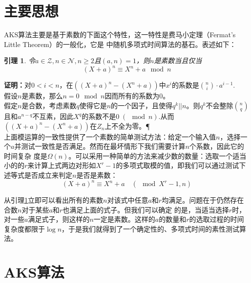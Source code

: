\documentclass[a4paper]{article}
\newtheorem{lemma}{引理}[section]
\numberwithin{equation}{section}
\begin{document}
\begin{multicols}{2}
  \section{主要思想}
  AKS算法主要是基于素数的下面这个特性，这一特性是费马小定理（Fermat’s Little
  Theorem）的一般化，它是\cite{AB03} 中随机多项式时间算法的基石。表述如下：
  \begin{lemma}\label{idea}
    \upshape 令$a\in \mathcal{Z},n\in \mathcal{N},n\ge
    2$且$(a,n)=1$，则$n$是素数当且仅当
    \begin{equation}
      (X+a)^{n}\equiv X^n+a\mod{n}
    \end{equation}
  \end{lemma}
  \noindent \textbf{证明：}对$0<i<n$，在$((X+a)^n - (X^n +
  a))$中$x^i$的系数是$\binom{n}{i}\cdot a^{i-1}$.\\[0.2cm]
  假设$n$是素数，那么$n=0\mod{n}$因而所有的系数为0。\\[0.2cm]
  假定$n$是合数，考虑素数$q$使得它是$n$的一个因子，且使得$q^k||n$。则$q^k$不会整除$\binom{n}{q}$且和$a^{
    n-q}$不互素，因此$X^q$的系数不是$0\;(\!\!\!\!\!\mod{n})$.从而$((X+a)^n-(X^n+a))$在$\mathit{Z}_n$上不全为零。\P\\[0.2cm]
  上面模运算的一致性提供了一个素数的简单测试方法：给定一个输入值$n$，选择一个$a$并测试一致性是否满足。然而在最坏情形下我们需要计算$n$个系数，因此它的时间复杂
  度是$\Omega
  (n)$。可以采用一种简单的方法来减少数的数量：选取一个适当小的的$r$来计算上式两边对形如$X^r-1$的多项式取模的值，即我们可以通过测试下述等式是否成立来判定$n$是否是素数：
  \begin{equation}\label{key}
    (X+a)^n\equiv X^n+a \quad(\!\!\!\!\!\mod{X^r-1},n)
  \end{equation}

  从引理\ref{idea}立即可以看出所有的素数$n$对该式中任意$a$和$r$均满足。问题在于仍然存在合数$n$对于某些$a$和$r$也满足上面的式子。但我们可以确定
  的是，当适当选择$r$时，对一些$a$满足式子，则这样的$n$一定是素数。这样的$a$的数量和$r$的选取过程的时间复杂度都限于$\log
  n$，于是我们就得到了一个确定性的、多项式时间的素性测试算法。
  \section{AKS算法}

\end{multicols}
\end{document}
